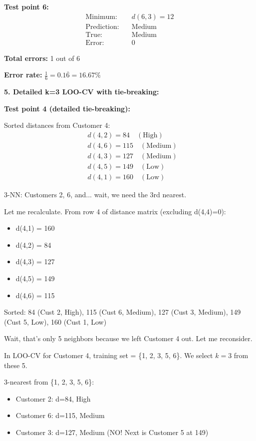\documentclass[12pt]{article}
\begin{document}
\begin{computation}
\textbf{Test point 6:}
\begin{align*}
\text{Minimum:} &\quad d(6,3) = 12 \\
\text{Prediction:} &\quad \text{Medium} \\
\text{True:} &\quad \text{Medium} \\
\text{Error:} &\quad 0
\end{align*}

\textbf{Total errors:} 1 out of 6

\textbf{Error rate:} \(\frac{1}{6} = 0.1\overline{6} = 16.67\%\)

\textbf{5. Detailed k=3 LOO-CV with tie-breaking:}

\textbf{Test point 4 (detailed tie-breaking):}

Sorted distances from Customer 4:
\begin{align*}
&d(4,2) = 84 \quad (\text{High}) \\
&d(4,6) = 115 \quad (\text{Medium}) \\
&d(4,3) = 127 \quad (\text{Medium}) \\
&d(4,5) = 149 \quad (\text{Low}) \\
&d(4,1) = 160 \quad (\text{Low})
\end{align*}

3-NN: Customers 2, 6, and... wait, we need the 3rd nearest.

Let me recalculate. From row 4 of distance matrix (excluding d(4,4)=0):
\begin{itemize}
    \item d(4,1) = 160
    \item d(4,2) = 84
    \item d(4,3) = 127
    \item d(4,5) = 149
    \item d(4,6) = 115
\end{itemize}

Sorted: 84 (Cust 2, High), 115 (Cust 6, Medium), 127 (Cust 3, Medium), 149 (Cust 5, Low), 160 (Cust 1, Low)

Wait, that's only 5 neighbors because we left Customer 4 out. Let me reconsider.

In LOO-CV for Customer 4, training set = \{1, 2, 3, 5, 6\}. We select \(k=3\) from these 5.

3-nearest from \{1, 2, 3, 5, 6\}:
\begin{itemize}
    \item Customer 2: d=84, High
    \item Customer 6: d=115, Medium
    \item Customer 3: d=127, Medium (NO! Next is Customer 5 at 149)
\end{itemize}


\end{computation}
\end{document}

